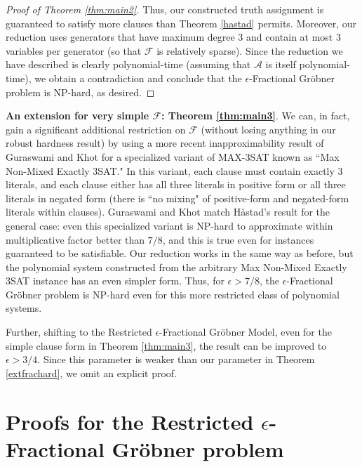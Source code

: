 \documentclass{article}
\newcommand{\F}[0]{\mathcal{F}}
\newcommand{\A}[0]{\mathcal{A}}
\newcommand{\ep}[0]{\epsilon}
\begin{document}
\begin{proof}[Proof of Theorem \ref{thm:main2}]
Thus, our constructed truth assignment is guaranteed to satisfy more clauses than Theorem \ref{hastad} permits.  Moreover, our reduction uses generators that have maximum degree 3 and contain at most 3 variables per generator (so that $\F$ is relatively sparse).  Since the reduction we have described is clearly polynomial-time (assuming that $\A$ is itself polynomial-time), we obtain a contradiction and conclude that the $\ep$\nobreakdash-Fractional Gr\"obner problem is NP-hard, as desired. 
\end{proof}



\noindent\textbf{An extension for very simple $\F$: Theorem \ref{thm:main3}}. 
We can, in fact, gain a significant additional restriction on $\F$ (without losing anything in our robust hardness result) by using a more recent inapproximability result of Guraswami and Khot \cite{guruswamikhot} for a specialized variant of MAX\nobreakdash-3SAT known as ``Max Non-Mixed Exactly 3SAT." In this variant, each clause must contain exactly 3 literals, and each clause either has all three literals in positive form or all three literals in negated form (there is ``no mixing" of positive-form and negated-form literals within clauses). Guraswami and Khot match H{\aa}stad's result for the general case: even this specialized variant is NP-hard to approximate within multiplicative factor better than $7/8$, and this is true even for instances guaranteed to be satisfiable. Our reduction works in the same way as before, but the polynomial system constructed from the arbitrary Max Non-Mixed Exactly 3SAT instance has an even simpler form. Thus, for $\ep > 7/8$, the $\ep$\nobreakdash-Fractional Gr\"{o}bner problem is NP-hard even for this more restricted class of polynomial systems.

Further,  shifting to the Restricted $\epsilon$\nobreakdash-Fractional Gr\"{o}bner Model, even for the simple clause form in Theorem \ref{thm:main3}, the result can be improved to $\ep > 3/4$. Since this parameter is weaker than our parameter in Theorem \ref{extfrachard}, we omit an explicit proof. 

\section{Proofs for the Restricted $\ep$\nobreakdash-Fractional Gr\"{o}bner problem}
\label{sec:restricted}
\end{document}
